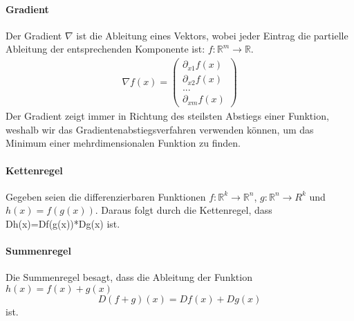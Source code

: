 \paragraph{Gradient}
Der Gradient $\nabla$ ist die Ableitung eines Vektors, wobei jeder Eintrag die partielle Ableitung der entsprechenden Komponente ist:
$f:\mathds{R}^m\rightarrow\mathds{R}$.
\begin{equation*} \begin{split} \nabla f(x) = \left( \begin{array}{c}
\partial_{x1} f(x) \\
\partial_{x2} f(x) \\
... \\
\partial_{xm} f(x)
\end{array}
\right)
\end{split} \end{equation*} 
Der Gradient zeigt immer in Richtung des steilsten Abstiegs einer Funktion, weshalb wir das Gradientenabstiegsverfahren verwenden können, um das Minimum einer mehrdimensionalen Funktion zu finden.


\paragraph{Kettenregel}
Gegeben seien die differenzierbaren Funktionen $f:\mathds{R}^k\rightarrow\mathds{R}^n$, $g:\mathds{R}^n\rightarrow{R}^k$ und $h(x)=f(g(x))$. Daraus folgt durch die Kettenregel, dass Dh(x)=Df(g(x))*Dg(x) ist.

\paragraph{Summenregel}
Die Summenregel besagt, dass die Ableitung der Funktion $h(x)=f(x)+g(x)$ \begin{equation*} D(f + g)(x)=Df(x)+Dg(x)\end{equation*} ist.

